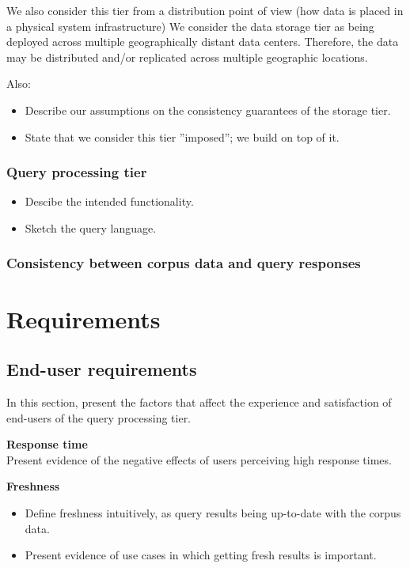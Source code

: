 We also consider this tier from a distribution point of view (how data is
placed in a physical system infrastructure)
We consider the data storage tier as being deployed across multiple
geographically distant data centers.
Therefore, the data may be distributed and/or replicated across multiple
geographic locations.

Also:
\begin{itemize}
  \item Describe our assumptions on the consistency guarantees of the storage
  tier.
  \item State that we consider this tier ''imposed''; we build on top of it.
\end{itemize}

\subsubsection{Query processing tier}

\begin{itemize}
  \item Descibe the intended functionality.
  \item Sketch the query language.
\end{itemize}


\subsubsection{Consistency between corpus data and query responses}

\section{Requirements}
\label{sec:requirements}

\subsection{End-user requirements}
In this section, present the factors that affect the experience and satisfaction
of end-users of the query processing tier.

\textbf{Response time} \\
Present evidence of the negative effects of users perceiving high response times.

\textbf{Freshness}
\begin{itemize}
  \item Define freshness intuitively, as query results being up-to-date with the
  corpus data.
  \item Present evidence of use cases in which getting fresh results is
  important.
\end{itemize}

